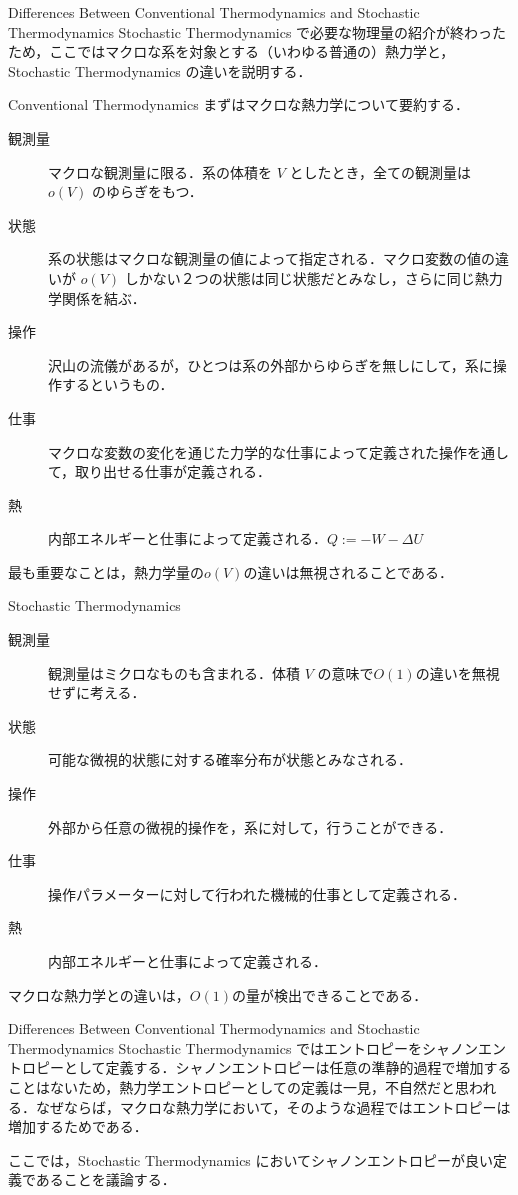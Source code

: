 \documentclass[aspectratio=169, dvipdfmx, 11pt,uplatex]{beamer} %
\begin{document}
\begin{frame}{Differences Between Conventional Thermodynamics and Stochastic Thermodynamics}
  Stochastic Thermodynamics で必要な物理量の紹介が終わったため，ここではマクロな系を対象とする（いわゆる普通の）熱力学と，Stochastic Thermodynamics の違いを説明する．
\end{frame}

\begin{frame}{Conventional Thermodynamics}
  まずはマクロな熱力学について要約する．
  \begin{description}
    \item[観測量] マクロな観測量に限る．系の体積を $V$ としたとき，全ての観測量は $o(V)$ のゆらぎをもつ．
    \item[状態] 系の状態はマクロな観測量の値によって指定される．マクロ変数の値の違いが $o(V)$ しかない２つの状態は同じ状態だとみなし，さらに同じ熱力学関係を結ぶ．
    \item[操作] 沢山の流儀があるが，ひとつは系の外部からゆらぎを無しにして，系に操作するというもの．
    \item[仕事] マクロな変数の変化を通じた力学的な仕事によって定義された操作を通して，取り出せる仕事が定義される．
    \item[熱] 内部エネルギーと仕事によって定義される．$Q := -W - \Delta U$ 
  \end{description}
  最も重要なことは，熱力学量の$o(V)$の違いは無視されることである．
\end{frame}

\begin{frame}{Stochastic Thermodynamics}
  \begin{description}
    \item[観測量] 観測量はミクロなものも含まれる．体積 $V$ の意味で$O(1)$の違いを無視せずに考える．
    \item[状態] 可能な微視的状態に対する確率分布が状態とみなされる．
    \item[操作] 外部から任意の微視的操作を，系に対して，行うことができる．
    \item[仕事] 操作パラメーターに対して行われた機械的仕事として定義される．
    \item[熱] 内部エネルギーと仕事によって定義される． 
  \end{description}
  マクロな熱力学との違いは，$O(1)$の量が検出できることである．
\end{frame}

\begin{frame}{Differences Between Conventional Thermodynamics and Stochastic Thermodynamics}
  Stochastic Thermodynamics ではエントロピーをシャノンエントロピーとして定義する．シャノンエントロピーは任意の準静的過程で増加することはないため，熱力学エントロピーとしての定義は一見，不自然だと思われる．なぜならば，マクロな熱力学において，そのような過程ではエントロピーは増加するためである．\par 
  ここでは，Stochastic Thermodynamics においてシャノンエントロピーが良い定義であることを議論する．
\end{frame}
\end{document}
